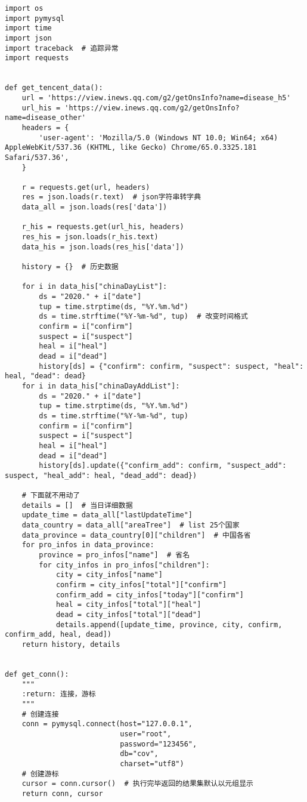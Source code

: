 \begin{lstlisting}
import os
import pymysql
import time
import json
import traceback  # 追踪异常
import requests


def get_tencent_data():
    url = 'https://view.inews.qq.com/g2/getOnsInfo?name=disease_h5'
    url_his = 'https://view.inews.qq.com/g2/getOnsInfo?name=disease_other'
    headers = {
        'user-agent': 'Mozilla/5.0 (Windows NT 10.0; Win64; x64) AppleWebKit/537.36 (KHTML, like Gecko) Chrome/65.0.3325.181 Safari/537.36',
    }

    r = requests.get(url, headers)
    res = json.loads(r.text)  # json字符串转字典
    data_all = json.loads(res['data'])

    r_his = requests.get(url_his, headers)
    res_his = json.loads(r_his.text)
    data_his = json.loads(res_his['data'])

    history = {}  # 历史数据

    for i in data_his["chinaDayList"]:
        ds = "2020." + i["date"]
        tup = time.strptime(ds, "%Y.%m.%d")
        ds = time.strftime("%Y-%m-%d", tup)  # 改变时间格式
        confirm = i["confirm"]
        suspect = i["suspect"]
        heal = i["heal"]
        dead = i["dead"]
        history[ds] = {"confirm": confirm, "suspect": suspect, "heal": heal, "dead": dead}
    for i in data_his["chinaDayAddList"]:
        ds = "2020." + i["date"]
        tup = time.strptime(ds, "%Y.%m.%d")
        ds = time.strftime("%Y-%m-%d", tup)
        confirm = i["confirm"]
        suspect = i["suspect"]
        heal = i["heal"]
        dead = i["dead"]
        history[ds].update({"confirm_add": confirm, "suspect_add": suspect, "heal_add": heal, "dead_add": dead})

    # 下面就不用动了
    details = []  # 当日详细数据
    update_time = data_all["lastUpdateTime"]
    data_country = data_all["areaTree"]  # list 25个国家
    data_province = data_country[0]["children"]  # 中国各省
    for pro_infos in data_province:
        province = pro_infos["name"]  # 省名
        for city_infos in pro_infos["children"]:
            city = city_infos["name"]
            confirm = city_infos["total"]["confirm"]
            confirm_add = city_infos["today"]["confirm"]
            heal = city_infos["total"]["heal"]
            dead = city_infos["total"]["dead"]
            details.append([update_time, province, city, confirm, confirm_add, heal, dead])
    return history, details


def get_conn():
    """
    :return: 连接，游标
    """
    # 创建连接
    conn = pymysql.connect(host="127.0.0.1",
                           user="root",
                           password="123456",
                           db="cov",
                           charset="utf8")
    # 创建游标
    cursor = conn.cursor()  # 执行完毕返回的结果集默认以元组显示
    return conn, cursor



\end{lstlisting}
